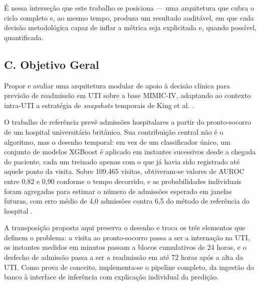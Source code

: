 \documentclass{ieeeaccess}
\begin{document}
É nessa interseção que este trabalho se posiciona --- uma arquitetura que cubra o ciclo completo e, ao mesmo tempo, produza um resultado auditável, em que cada decisão metodológica capaz de inflar a métrica seja explicitada e, quando possível, quantificada.

\subsection*{C. Objetivo Geral}
Propor e avaliar uma arquitetura modular de apoio à decisão clínica para previsão de readmissão em UTI sobre a base MIMIC-IV, adaptando ao contexto intra-UTI a estratégia de \textit{snapshots} temporais de King et al. \cite{King2022}.

O trabalho de referência prevê admissões hospitalares a partir do pronto-socorro de um hospital universitário britânico. Sua contribuição central não é o algoritmo, mas o desenho temporal: em vez de um classificador único, um conjunto de modelos XGBoost é aplicado em instantes sucessivos desde a chegada do paciente, cada um treinado apenas com o que já havia sido registrado até aquele ponto da visita. Sobre 109.465 visitas, obtiveram-se valores de AUROC entre 0,82 e 0,90 conforme o tempo decorrido, e as probabilidades individuais foram agregadas para estimar o número de admissões esperado em janelas futuras, com erro médio de 4,0 admissões contra 6,5 do método de referência do hospital \cite{King2022}.

A transposição proposta aqui preserva o desenho e troca os três elementos que definem o problema: a visita ao pronto-socorro passa a ser a internação na UTI, os instantes medidos em minutos passam a blocos cumulativos de 24 horas, e o desfecho de admissão passa a ser a readmissão em até 72 horas após a alta da UTI. Como prova de conceito, implementa-se o pipeline completo, da ingestão do banco à interface de inferência com explicação individual da predição.
\end{document}
